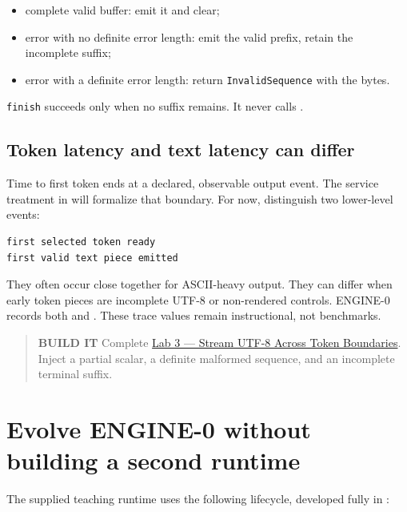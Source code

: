 \begin{itemize}
\tightlist
\item
  complete valid buffer: emit it and clear;
\item
  error with no definite error length: emit the valid prefix, retain the
  incomplete suffix;
\item
  error with a definite error length: return \texttt{InvalidSequence}
  with the bytes.
\end{itemize}

\texttt{finish} succeeds only when no suffix remains. It never calls
\texttt{}.

\subsection{Token latency and text latency can
differ}\label{token-latency-and-text-latency-can-differ}

Time to first token ends at a declared, observable output event.
The service treatment in  will formalize that
boundary. For now, distinguish two lower-level events:

\begin{verbatim}
first selected token ready
first valid text piece emitted
\end{verbatim}

They often occur close together for ASCII-heavy output. They can differ
when early token pieces are incomplete UTF-8 or non-rendered controls.
ENGINE-0 records both \texttt{} and
\texttt{}. These trace values remain
instructional, not benchmarks.

\begin{quote}
\textbf{BUILD IT} Complete
\href{https://github.com/hermonai/inside-the-llm-engine/blob/astra-visual-rewrite/labs/lab-03-stream-utf8-across-tokens.md}{Lab
3 --- Stream UTF-8 Across Token Boundaries}. Inject a partial scalar, a
definite malformed sequence, and an incomplete terminal suffix.
\end{quote}

\section{Evolve ENGINE-0 without building a second
runtime}\label{evolve-engine-0-without-building-a-second-runtime}

The supplied teaching runtime uses the following lifecycle, developed
fully in :

